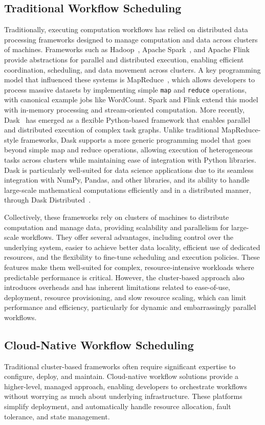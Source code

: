 \documentclass[conference]{IEEEtran}
\begin{document}
\subsection{Traditional Workflow Scheduling}
Traditionally, executing computation workflows has relied on distributed data processing frameworks designed to manage computation and data across clusters of machines. Frameworks such as Hadoop~\cite{apache_hadoop}, Apache Spark~\cite{apache_spark}, and Apache Flink~\cite{apache_flink} provide abstractions for parallel and distributed execution, enabling efficient coordination, scheduling, and data movement across clusters. A key programming model that influenced these systems is MapReduce~\cite{mapreduce}, which allows developers to process massive datasets by implementing simple \texttt{map} and \texttt{reduce} operations, with canonical example jobs like WordCount. Spark and Flink extend this model with in-memory processing and stream-oriented computation. More recently, Dask~\cite{dask_python} has emerged as a flexible Python-based framework that enables parallel and distributed execution of complex task graphs. Unlike traditional MapReduce-style frameworks, Dask supports a more generic programming model that goes beyond simple map and reduce operations, allowing execution of heterogeneous tasks across clusters while maintaining ease of integration with Python libraries. Dask is particularly well-suited for data science applications due to its seamless integration with NumPy, Pandas, and other libraries, and its ability to handle large-scale mathematical computations efficiently and in a distributed manner, through Dask Distributed~\cite{dask_python_distributed}.

Collectively, these frameworks rely on clusters of machines to distribute computation and manage data, providing scalability and parallelism for large-scale workflows. They offer several advantages, including control over the underlying system, easier to achieve better data locality, efficient use of dedicated resources, and the flexibility to fine-tune scheduling and execution policies. These features make them well-suited for complex, resource-intensive workloads where predictable performance is critical. However, the cluster-based approach also introduces overheads and has inherent limitations related to ease-of-use, deployment, resource provisioning, and slow resource scaling, which can limit performance and efficiency, particularly for dynamic and embarrassingly parallel workflows.

\subsection{Cloud-Native Workflow Scheduling}
Traditional cluster-based frameworks often require significant expertise to configure, deploy, and maintain. Cloud-native workflow solutions provide a higher-level, managed approach, enabling developers to orchestrate workflows without worrying as much about underlying infrastructure. These platforms simplify deployment, and automatically handle resource allocation, fault tolerance, and state management.
\end{document}
